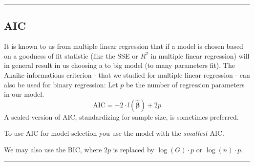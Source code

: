 \documentclass[
]{article}
\begin{document}
\begin{center}\rule{0.5\linewidth}{0.5pt}\end{center}

\hypertarget{aic}{%
\subsection{AIC}\label{aic}}

It is known to us from multiple linear regression that if a model is
chosen based on a goodness of fit statistic (like the SSE or \(R^2\) in
multiple linear regression) will in general result in us choosing a to
big model (to many parameters fit). The Akaike informations criterion -
that we studied for multiple linear regression - can also be used for
binary regression: Let \(p\) be the number of regression parameters in
our model. \[\text{AIC} =-2 \cdot l(\hat{\boldsymbol{\beta}})+2p\] A
scaled version of AIC, standardizing for sample size, is sometimes
preferred.

To use AIC for model selection you use the model with the
\emph{smallest} AIC.

We may also use the BIC, where \(2p\) is replaced by \(\log(G)\cdot p\)
or \(\log(n)\cdot p\).

\begin{center}\rule{0.5\linewidth}{0.5pt}\end{center}

\footnotesize
\end{document}

